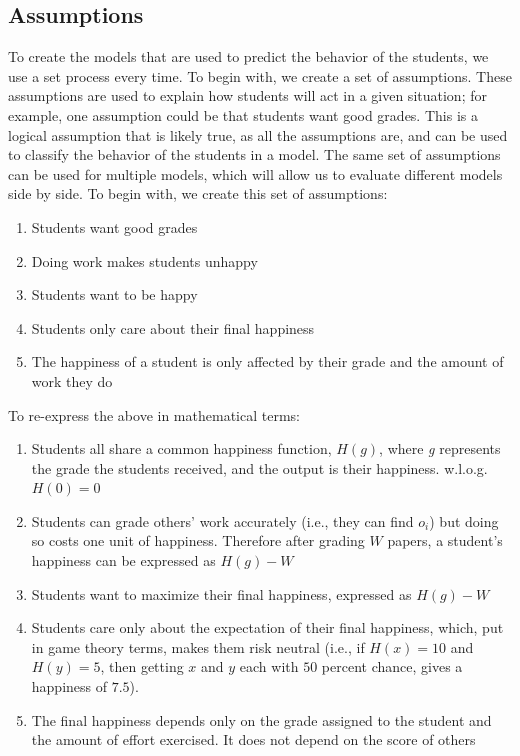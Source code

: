 \documentclass[12pt, Arial]{article}
\begin{document}
\subsection{Assumptions}
To create the models that are used to predict the behavior of the students, we use a set process every time. To begin with, we create a set of assumptions. These assumptions are used to explain how students will act in a given situation; for example, one assumption could be that students want good grades. This is a logical assumption that is likely true, as all the assumptions are, and can be used to classify the behavior of the students in a model. The same set of assumptions can be used for multiple models, which will allow us to evaluate different models side by side. To begin with, we create this set of assumptions:
\begin{enumerate}[itemsep=0pt, parsep=0pt]
	\item Students want good grades
	\item Doing work makes students unhappy
	\item Students want to be happy
	\item Students only care about their final happiness
	\item The happiness of a student is only affected by their grade and the amount of work they do
\end{enumerate}
To re-express the above in mathematical terms:
\begin{enumerate}[itemsep=0pt, parsep=0pt]
	\item Students all share a common happiness function, $H(g)$, where \emph{g} represents the grade the students received, and the output is their happiness. w.l.o.g. $H(0)=0$
	\item Students can grade others' work accurately (i.e., they can find $o_i$) but doing so costs one unit of happiness. Therefore after grading $W$ papers, a student's happiness can be expressed as $H(g)-W$
	\item Students want to maximize their final happiness, expressed as $H(g)-W$
	\item Students care only about the expectation of their final happiness, which, put in game theory terms, makes them risk neutral (i.e., if $H(x)=10$ and $H(y)=5$, then getting $x$ and $y$ each with $50$ percent chance, gives a happiness of $7.5$).
	\item The final happiness depends only on the grade assigned to the student and the amount of effort exercised. It does not depend on the score of others
\end{enumerate}
\end{document}
